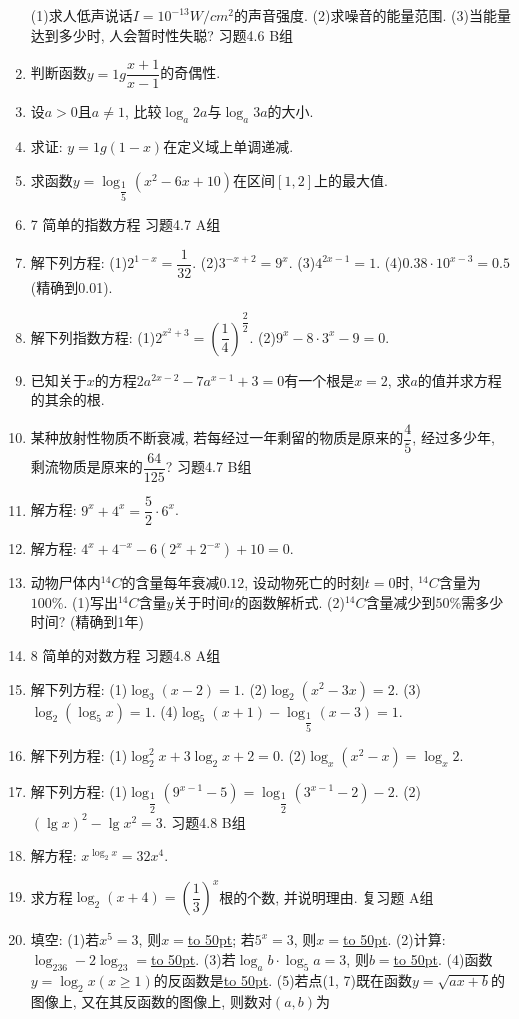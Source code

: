 \documentclass[10pt,a4paper]{article}
\newcommand{\blank}[1]{\underline{\hbox to #1pt{}}}
\begin{document}
\begin{enumerate}[1.]
(1)求人低声说话$I=10^{-13}W/cm^2$的声音强度.
(2)求噪音的能量范围.
(3)当能量达到多少时, 人会暂时性失聪?
习题4.6  B组
\item 判断函数$y=1g\dfrac{x+1}{x-1}$的奇偶性.
\item 设$a>0$且$a\ne 1$, 比较$\log _a2a$与$\log _a3a$的大小.
\item 求证: $y=1g(1-x)$在定义域上单调递减.
\item 求函数$y=\log _{\dfrac 15}(x^2-6x+10)$在区间$[1,2]$上的最大值.
\item 7  简单的指数方程
习题4.7  A组
\item 解下列方程:
(1)$2^{1-x}=\dfrac 1{32}$.						(2)$3^{-x+2}=9^x$.
(3)$4^{2x-1}=1$.						(4)$0.38\cdot 10^{x-3}=0.5$(精确到0.01).
\item 解下列指数方程:
(1)$2^{x^2+3}=(\dfrac 14)^{\dfrac 22}$.					(2)$9^x-8\cdot 3^x-9=0$.
\item 已知关于$x$的方程$2a^{2x-2}-7a^{x-1}+3=0$有一个根是$x=2$, 求$a$的值并求方程的其余的根.
\item 某种放射性物质不断衰减, 若每经过一年剩留的物质是原来的$\dfrac 45$, 经过多少年, 剩流物质是原来的$\dfrac{64}{125}$?
习题4.7  B组
\item 解方程: $9^x+4^x=\dfrac 52\cdot 6^x$.
\item 解方程: $4^x+4^{-x}-6(2^x+2^{-x})+10=0$.
\item 动物尸体内$^{14}C$的含量每年衰减$0.12$, 设动物死亡的时刻$t=0$时, $^{14}C$含量为$100\%$.
(1)写出$^{14}C$含量$y$关于时间$t$的函数解析式.
(2)$^{14}C$含量减少到$50\%$需多少时间? (精确到1年)
\item 8  简单的对数方程
习题4.8  A组
\item 解下列方程:
(1)$\log _3(x-2)=1$.					(2)$\log _2(x^2-3x)=2$.
(3)$\log _2(\log _5x)=1$.				(4)$\log _5(x+1)-\log _{\dfrac 15}(x-3)=1$.
\item 解下列方程:
(1)$\log _2^2x+3\log _2x+2=0$.			(2)$\log _x(x^2-x)=\log _x2$.
\item 解下列方程:
(1)$\log _{\dfrac 12}(9^{x-1}-5)=\log _{\dfrac 12}(3^{x-1}-2)-2$.	(2)$(\lg x)^2-\lg x^2=3$.
习题4.8  B组
\item 解方程: $x^{\log _2x}=32x^4$.
\item 求方程$\log _2(x+4)=(\dfrac 13)^x$根的个数, 并说明理由.
复习题
A组
\item 填空:
(1)若$x^5=3$, 则$x=$\blank{50}; 若$5^x=3$, 则$x=$\blank{50}.
(2)计算: $\log _236-2\log _23=$\blank{50}.
(3)若$\log _ab\cdot \log _5a=3$, 则$b=$\blank{50}.
(4)函数$y=\log _2x(x\ge 1)$的反函数是\blank{50}.
(5)若点(1, 7)既在函数$y=\sqrt {ax+b}$的图像上, 又在其反函数的图像上, 则数对$(a,b)$为

\end{enumerate}
\end{document}

